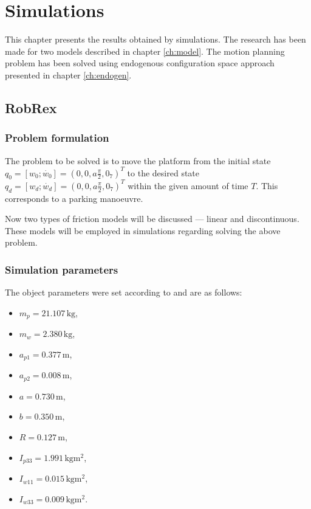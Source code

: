 \chapter{Simulations}
This chapter presents the results obtained by simulations. The research has been made for two models
described in chapter \ref{ch:model}. The motion planning problem has been solved using endogenous
configuration space approach presented in chapter \ref{ch:endogen}.
\section{RobRex}
\subsection{Problem formulation}
The problem to be solved is to move the platform from the initial state
$q_0 = [w_0; \dot{w_0}] = (0, 0, a\frac{\pi}{2}, 0_7)^T$ to the desired state
$q_d = [w_d; \dot{w_d}] = (0, 0, a\frac{\pi}{2}, 0_7)^T$
within the given amount of time $T$. 
This corresponds to a parking manoeuvre.

Now two types of friction models will be discussed --- linear
and discontinuous. These models will be employed in simulations
regarding solving the above problem.

\subsection{Simulation parameters}
The object parameters were set according to \cite{coupled} and are as follows:
\begin{multicols}{2}
\begin{itemize}
\item $m_p = 21.107\,\mathrm{kg}$,
\item $m_w = 2.380\,\mathrm{kg}$,
\item $a_{p1} = 0.377\,\mathrm{m}$,
\item $a_{p2} = 0.008\,\mathrm{m}$,
\item $a = 0.730\,\mathrm{m}$,
\item $b = 0.350\,\mathrm{m}$,
\item $R = 0.127\,\mathrm{m}$,
\item $I_{p33} = 1.991\,\mathrm{kgm^2}$,
\item $I_{w11} = 0.015\,\mathrm{kgm^2}$,
\item $I_{w33} = 0.009\,\mathrm{kgm^2}$.
\end{itemize}
\end{multicols}

